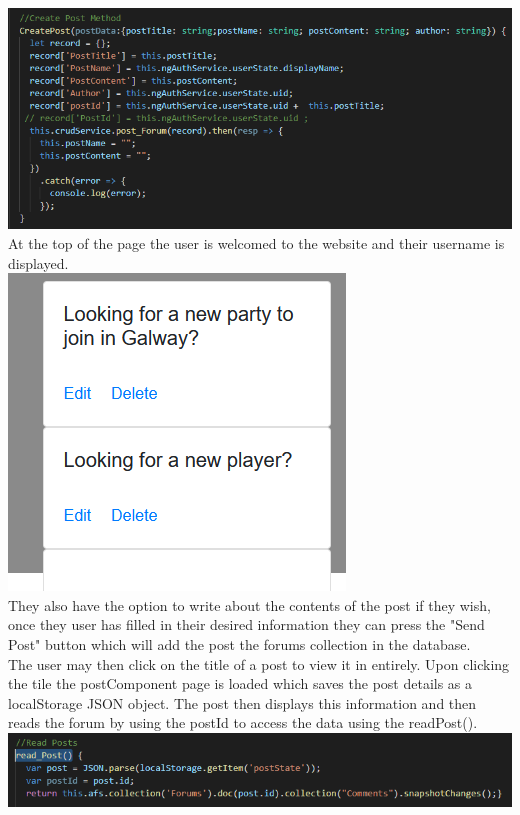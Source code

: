\includegraphics[scale=0.3]{./img/CreatePost.PNG}
At the top of the page the user is welcomed to the website and their username is displayed. \\
\includegraphics[scale=0.3]{./img/ForumsRead.png} \\
 They also have the option to write about the contents of the post if they wish, once they user has filled in their desired information they can press the "Send Post" button which will add the post the forums collection in the database. \\
 
 The user may then click on the title of a post to view it in entirely. Upon clicking the tile the postComponent page is loaded which saves the post details as a localStorage JSON object. The post then displays this information and then reads the forum by using the postId to access the data using the readPost().\\
\includegraphics[scale=0.3]{./img/GetPost.png} \\

